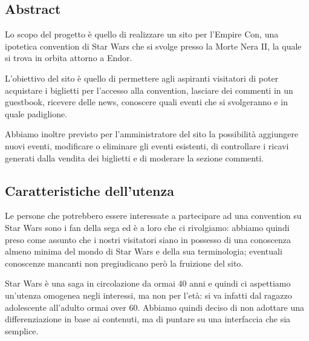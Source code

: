 \subsection{Abstract}
Lo scopo del progetto è quello di realizzare un sito per l'Empire Con, una ipotetica convention di Star Wars che si svolge presso la Morte Nera II, la quale si trova in orbita attorno a Endor.

L'obiettivo del sito è quello di permettere agli aspiranti visitatori di poter acquistare i biglietti per l'accesso alla convention, lasciare dei commenti in un guestbook, ricevere delle news, conoscere quali eventi che si svolgeranno e in quale padiglione.

Abbiamo inoltre previsto per l'amministratore del sito la possibilità aggiungere nuovi eventi, modificare o eliminare gli eventi esistenti, di controllare i ricavi generati dalla vendita dei biglietti e di moderare la sezione commenti.

\subsection{Caratteristiche dell’utenza}
Le persone che potrebbero essere interessate a partecipare ad una convention su Star Wars sono i fan della sega ed è a loro che ci rivolgiamo: abbiamo quindi preso come assunto che i nostri visitatori siano in possesso di una conoscenza almeno minima del mondo di Star Wars e della sua terminologia; eventuali conoscenze mancanti non pregiudicano però la fruizione del sito.

Star Wars è una saga in circolazione da ormai 40 anni e quindi ci aspettiamo un'utenza omogenea negli interessi, ma non per l'età: si va infatti dal ragazzo adolescente all'adulto ormai over 60.
Abbiamo quindi deciso di non adottare una differenziazione in base ai contenuti, ma di puntare su una interfaccia che sia semplice.

